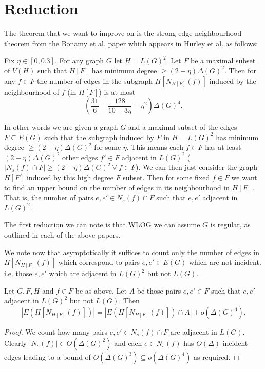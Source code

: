 \section{Reduction}
\label{sec:sec_reduction}

The theorem that we want to improve on is the strong edge neighbourhood theorem from
the Bonamy et al. paper which appears in Hurley et al. as follows:
\begin{knowntheorem}
    Fix $\eta \in [0, 0.3]$. For any graph $G$ let $H=L(G)^2$. Let $F$ be a
    maximal subset of $V(H)$ such that $H[F]$ has minimum degree
    $\geq (2-\eta)\Delta(G)^2$. Then for any $f\in F$ the number of edges in the subgraph
    $H[N_{H[F]}(f)]$ induced by the neighbourhood of $f$ (in $H[F]$) is at most
    \[
        \left(\frac{31}{6} - \frac{128}{10-3\eta} - \eta^2\right)\Delta(G)^4.
    \]
\end{knowntheorem}

In other words we are given a graph $G$ and a maximal subset of the edges $F \subseteq E(G)$
such that the subgraph induced by $F$ in $H=L(G)^2$ has minimum degree
$\geq (2-\eta)\Delta(G)^2$ for some $\eta$. This means each $f \in F$ has
at least $(2-\eta)\Delta(G)^2$ other edges $f' \in F$ adjacent in $L(G)^2$
($|N_s(f) \cap F| \geq (2-\eta)\Delta(G)^2\ \forall\ f \in F$).
We can then just consider the graph $H[F]$ induced by this high degree $F$ subset.
Then for some fixed $f \in F$ we want to find an upper bound on the number of edges
in its neighbourhood in $H[F]$. That is, the number of pairs $e, e' \in N_s(f) \cap F$ such
that $e, e'$ adjacent in $L(G)^2$.

\begin{note}
    The first reduction we can note is that WLOG we can assume $G$ is regular,
    as outlined in each of the above papers.
\end{note}

We note now that asymptotically it suffices to count only the number of edges
in $H[N_{H[F]}(f)]$ which correspond to pairs $e, e'\in E(G)$ which are not incident.
i.e. those $e,e'$ which are adjacent in $L(G)^2$ but not $L(G)$.
\begin{lemma}
    \label{lemma:count_non_incident_pairs}
    Let $G, F, H$ and $f\in F$ be as above. Let $A$ be those pairs $e,e'\in F$
    such that $e, e'$ adjacent in $L(G)^2$ but not $L(G)$.
    Then
    \[
        |E(H[N_{H[F]}(f)])| = |E(H[N_{H[F]}(f)]) \cap A| + o(\Delta(G)^4).
    \]
\end{lemma}
\begin{proof}
    We count how many pairs $e, e' \in N_s(f) \cap F$ are adjacent in $L(G)$.
    Clearly $|N_s(f)| \in O(\Delta(G)^2)$ and each $e \in N_s(f)$ has $O(\Delta)$
    incident edges leading to a bound of $O(\Delta(G)^3) \subseteq o(\Delta(G)^4)$
    as required.
\end{proof}

